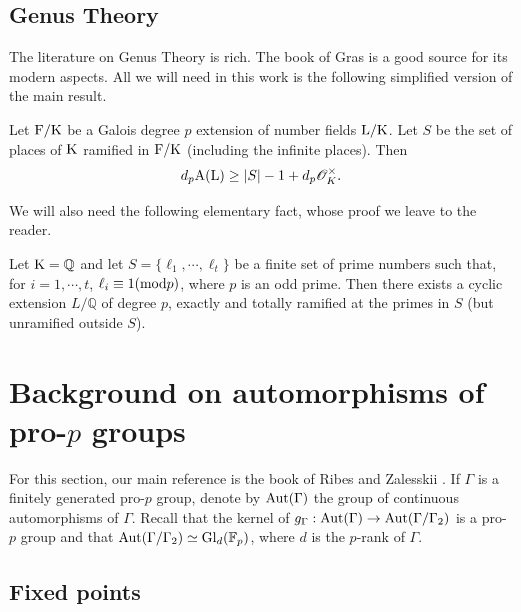 \documentclass[12pt,a4paper,twoside,english]{smfart}
\def\K{{\rm K}}
\def\L{{\rm L}}
\def\F{{\rm F}}
\def\Q{{\mathbb Q}}
\def\fq{{\mathbb F}}
\def\O{{\mathcal O}}
\def\Gl{{\rm Gl}}
\def\Aut{{\rm Aut}}
\def\A{{\rm A}}
\def\mod{{\rm mod}}
\begin{document}
\subsection{Genus Theory}

The literature on Genus Theory is rich. The book of Gras  \cite[Chapter IV, \S 4]{gras} is a good source for its modern aspects.  All we will need in this work is the following simplified version of the main result.

 \begin{theo} \label{theoriegenre}
  Let $\F/\K$ be a Galois degree $p$ extension of number fields $\L/\K$. Let $S$ be the set of places of  $\K$ ramified in 
$\F/\K$ (including the infinite places). Then $$d_p \A(\L) \geq |S| - 1 + d_p \O_K^\times.$$ 
  \end{theo}

We will also need the following elementary fact, whose proof we leave to the reader.

\begin{prop}\label{ramsurQ}
Let $\K=\Q$ and let  $S=\{\ell_1,\cdots, \ell_t \}$ be a finite set of prime numbers such that, for $i=1,\cdots, t$,   $\ell_i \equiv 1 (\mod p)$, where $p$ is an odd prime.
Then there exists a cyclic extension   $L/\Q$ of degree $p$,   exactly and totally ramified at the primes in $S$ (but unramified outside $S$).
\end{prop}
  
 
  \section{Background on automorphisms of  pro-$p$ groups}
 For this section, our main reference is the book of  Ribes and Zalesskii \cite[Chapter 2 and Chapter 4]{RZ}.
  If  $\Gamma$ is a finitely generated pro-$p$ group, denote by $\Aut(\Gamma)$ the group  of continuous automorphisms of  $\Gamma$.
  Recall  that the kernel of $g_\Gamma : \Aut(\Gamma) \rightarrow \Aut(\Gamma/\Gamma_2)$ is a pro-$p$ group and that  $\Aut(\Gamma/\Gamma_2) \simeq \Gl_d(\fq_p)$, where $d$ is the $p$-rank of  $\Gamma$.
  
 
 
  
  \subsection{Fixed points}
  
\end{document}
